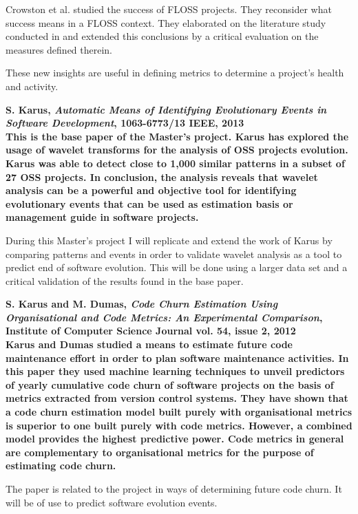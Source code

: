 \begin{thebibliography}{99}
		Crowston et al. studied the success of FLOSS projects. They reconsider what
		success means in a FLOSS context. They elaborated on the literature study
		conducted in \cite{crowston2003} and extended this conclusions by a critical
		evaluation on the measures defined therein.
		
		These new insights are useful in defining metrics to determine a project's
		health and activity.
	
	 \bfseries{S. Karus, \emph{Automatic Means of Identifying
		Evolutionary Events in Software Development}, 1063-6773/13 IEEE, 2013}\rm
		\\

		This is the base paper of the Master's project.
		Karus has explored the usage of wavelet transforms for the analysis of OSS
		projects evolution. Karus was able to detect close to 1,000 similar patterns
		in a subset of 27 OSS projects. In conclusion, the analysis reveals that
		wavelet analysis can be a powerful and objective tool for identifying
		evolutionary events that can be used as estimation basis or management guide
		in software projects.

		During this Master's project I will replicate and extend the work of Karus by
		comparing patterns and events in order to validate wavelet analysis as a tool
		to predict end of software evolution. This will be done using a larger data
		set and a critical validation of the results found in the base paper.

	 \bfseries{S. Karus and M. Dumas, \emph{Code Churn Estimation
		Using Organisational and Code Metrics: An Experimental Comparison}, Institute
		of Computer Science Journal vol. 54, issue 2, 2012}\rm
		\\

		Karus and Dumas studied a means to estimate future code maintenance effort in
		order to plan software maintenance activities. In this paper they used machine
		learning techniques to unveil predictors of yearly cumulative code churn of
		software projects on the basis of metrics extracted from version control
		systems. They have shown that a code churn estimation model built purely with
		organisational metrics is superior to one built purely with code metrics.
		However, a combined model provides the highest predictive power. Code metrics
		in general are complementary to organisational metrics for the purpose of
		estimating code churn.

		The paper is related to the project in ways of determining future code churn.
		It will be of use to predict software evolution events.
		

\end{thebibliography}
